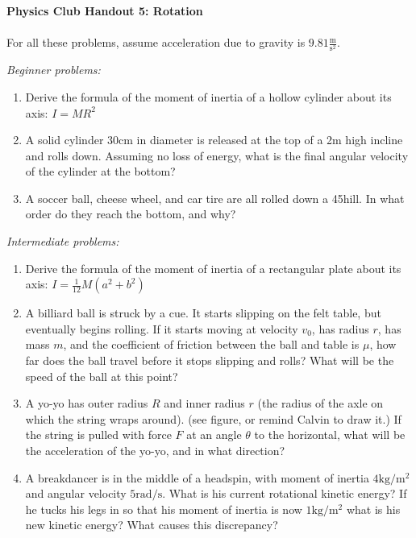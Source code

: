 \documentclass[12pt]{article}
\begin{document}
\textbf{Physics Club Handout 5: Rotation}
\\
\\
For all these problems, assume acceleration due to gravity is $9.81\frac{\text{m}}{\text{s}^2}$.

\emph{Beginner problems:}
\begin{enumerate}
\item
Derive the formula of the moment of inertia of a hollow cylinder about its axis: $I = MR^2$

\item
A solid cylinder 30cm in diameter is released at the top of a 2m high incline and rolls down. Assuming no loss of energy, what is the final angular velocity of the cylinder at the bottom?

\item
A soccer ball, cheese wheel, and car tire are all rolled down a 45\degree hill. In what order do they reach the bottom, and why?

\end{enumerate}

\emph{Intermediate problems:}
\begin{enumerate}
\item
Derive the formula of the moment of inertia of a rectangular plate about its axis: $I = \frac{1}{12}M(a^2+b^2)$

\item
A billiard ball is struck by a cue. It starts slipping on the felt table, but eventually begins rolling. If it starts moving at velocity $v_0$, has radius $r$, has mass $m$, and the coefficient of friction between the ball and table is $\mu$, how far does the ball travel before it stops slipping and rolls? What will be the speed of the ball at this point?

\item
A yo-yo has outer radius $R$ and inner radius $r$ (the radius of the axle on which the string wraps around). (see figure, or remind Calvin to draw it.) If the string is pulled with force $F$ at an angle $\theta$ to the horizontal, what will be the acceleration of the yo-yo, and in what direction?

\item
A breakdancer is in the middle of a headspin, with moment of inertia $4 \text{kg}/\text{m}^2$ and angular velocity $5 \text{rad}/\text{s}$. What is his current rotational kinetic energy? If he tucks his legs in so that his moment of inertia is now $1\text{kg}/\text{m}^2$ what is his new kinetic energy? What causes this discrepancy?

\end{enumerate}
\end{document}
